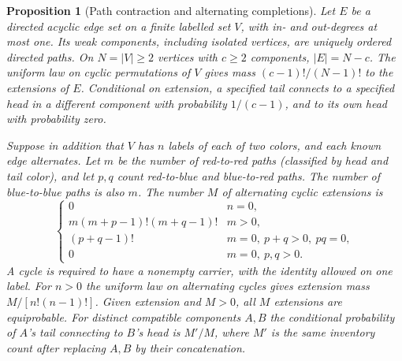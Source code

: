 \documentclass[11pt,reqno]{amsart}
\newtheorem{proposition}[theorem]{Proposition}
\theoremstyle{definition}
\theoremstyle{remark}
\numberwithin{equation}{section}
\begin{document}
\begin{proposition}[Path contraction and alternating completions]\label{m4:forest}
Let $E$ be a directed acyclic edge set on a finite labelled set $V$, with in- and out-degrees at most one. Its weak components, including isolated vertices, are uniquely ordered directed paths. On $N=|V|\ge2$ vertices with $c\ge2$ components, $|E|=N-c$. The uniform law on cyclic permutations of $V$ gives mass $(c-1)!/(N-1)!$ to the extensions of $E$. Conditional on extension, a specified tail connects to a specified head in a different component with probability $1/(c-1)$, and to its own head with probability zero.

Suppose in addition that $V$ has $n$ labels of each of two colors, and each known edge alternates. Let $m$ be the number of red-to-red paths (classified by head and tail color), and let $p,q$ count red-to-blue and blue-to-red paths. The number of blue-to-blue paths is also $m$. The number $M$ of alternating cyclic extensions is
\[
 \begin{cases}
 0 & n=0,\\
 m(m+p-1)!(m+q-1)! & m>0,\\
 (p+q-1)! & m=0,\ p+q>0,\ pq=0,\\
 0 & m=0,\ p,q>0.
 \end{cases}
\]
A cycle is required to have a nonempty carrier, with the identity allowed on one label. For $n>0$ the uniform law on alternating cycles gives extension mass $M/[n!(n-1)!]$. Given extension and $M>0$, all $M$ extensions are equiprobable. For distinct compatible components $A,B$ the conditional probability of $A$'s tail connecting to $B$'s head is $M'/M$, where $M'$ is the same inventory count after replacing $A,B$ by their concatenation.
\end{proposition}
\end{document}
